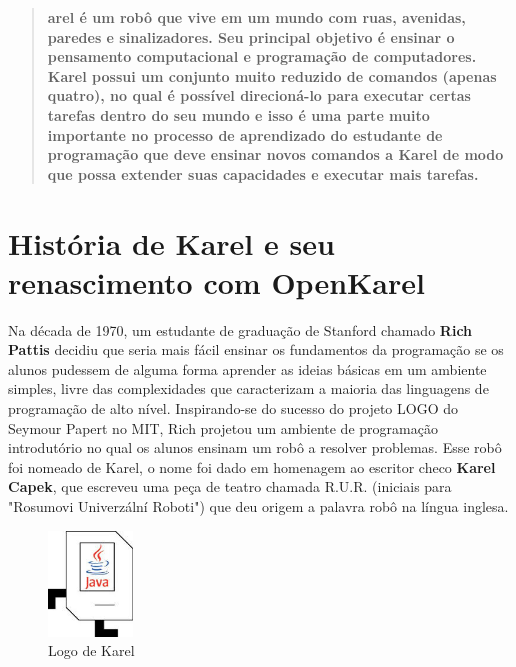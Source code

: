 \documentclass[a4paper,11pt]{article}
\begin{document}
\maketitle %
\thispagestyle{fancy} %


\begin{abstract}
\textbf{arel é um robô que vive em um mundo com ruas, avenidas, paredes e sinalizadores. Seu principal objetivo é ensinar o pensamento computacional e programação de computadores. Karel possui um conjunto muito reduzido de comandos (apenas quatro), no qual é possível direcioná-lo para executar certas tarefas dentro do seu mundo e isso é uma parte muito importante no processo de aprendizado do estudante de programação que deve ensinar novos comandos a Karel de modo que possa extender suas capacidades e executar mais tarefas.}
\end{abstract}

\section{História de Karel e seu renascimento com OpenKarel}
Na década de 1970, um estudante de graduação de Stanford chamado \textbf{Rich Pattis} decidiu que seria mais fácil ensinar os fundamentos da programação se os alunos pudessem de alguma forma aprender as ideias básicas em um ambiente simples, livre das complexidades que caracterizam a maioria das linguagens de programação de alto nível. Inspirando-se do sucesso do projeto LOGO do Seymour Papert no MIT, Rich projetou um ambiente de programação introdutório no qual os alunos ensinam um robô a resolver problemas. Esse robô foi nomeado de Karel, o nome foi dado em homenagem ao escritor checo \textbf{Karel Capek}, que escreveu uma peça de teatro chamada R.U.R. (iniciais para "Rosumovi Univerzální Roboti"\cite{rur}) que deu origem a palavra robô na língua inglesa.
\begin{figure}[H]
	\centering
	\includegraphics[width=0.2\textwidth]{imagem/logokarel.jpg}
	\caption{Logo de Karel}
\end{figure}
\end{document}
